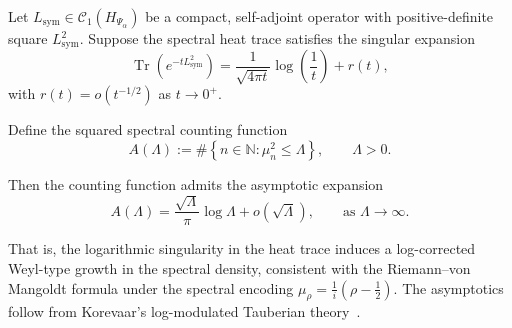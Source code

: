 \begin{lemma}
\label{lem:tauberian_log_correction}
Let \( L_{\mathrm{sym}} \in \mathcal{C}_1(H_{\Psi_\alpha}) \) be a compact, self-adjoint operator with positive-definite square \( L_{\mathrm{sym}}^2 \). Suppose the spectral heat trace satisfies the singular expansion
\[
\operatorname{Tr}(e^{-t L_{\mathrm{sym}}^2}) = \frac{1}{\sqrt{4\pi t}} \log\left( \frac{1}{t} \right) + r(t),
\]
with \( r(t) = o(t^{-1/2}) \) as \( t \to 0^+ \).

Define the squared spectral counting function
\[
A(\Lambda) := \#\left\{ n \in \mathbb{N} : \mu_n^2 \le \Lambda \right\}, \qquad \Lambda > 0.
\]

Then the counting function admits the asymptotic expansion
\[
A(\Lambda) = \frac{\sqrt{\Lambda}}{\pi} \log \Lambda + o(\sqrt{\Lambda}), \qquad \text{as } \Lambda \to \infty.
\]

\medskip
\noindent
That is, the logarithmic singularity in the heat trace induces a log-corrected Weyl-type growth in the spectral density, consistent with the Riemann–von Mangoldt formula under the spectral encoding \( \mu_\rho = \frac{1}{i}(\rho - \frac{1}{2}) \). The asymptotics follow from Korevaar’s log-modulated Tauberian theory~\cite[Ch.~III, §5]{Korevaar2004Tauberian}.
\end{lemma}
